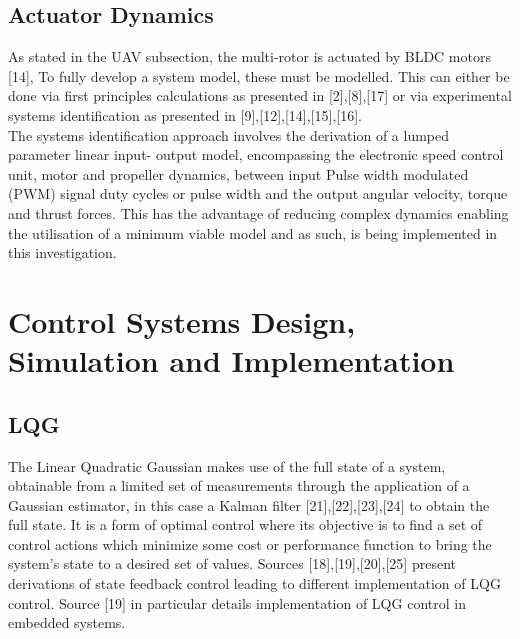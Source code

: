 \documentclass[12pt,a4paper,twoside]{report}
\begin{document}
			\subsection{Actuator Dynamics}	
				As stated in the UAV subsection, the multi-rotor is actuated by BLDC motors [14], To fully develop a system model, these must be modelled. This can either be done via first principles calculations as presented in [2],[8],[17] or via experimental systems identification as presented in [9],[12],[14],[15],[16]. 
				\\
				The systems identification approach involves the derivation of a lumped parameter linear input- output model, encompassing the electronic speed control unit, motor and propeller dynamics, between input Pulse width modulated (PWM) signal duty cycles or pulse width and the output angular velocity, torque and thrust forces. This has the advantage of reducing complex dynamics enabling the utilisation of a minimum viable model and as such, is being implemented in this investigation.
				
		\section{Control Systems Design, Simulation and Implementation}
		
			\subsection{LQG}
				The Linear Quadratic Gaussian makes use of the full state of a system, obtainable from a limited set of measurements through the application of a Gaussian estimator, in this case a Kalman filter [21],[22],[23],[24] to obtain the full state. It is a form of optimal control where its objective is to find a set of control actions which minimize some cost or performance function to bring the system’s state to a desired set of values. Sources [18],[19],[20],[25] present derivations of state feedback control leading to different implementation of LQG control. Source [19] in particular details implementation of LQG control in embedded systems.
				
\end{document}
